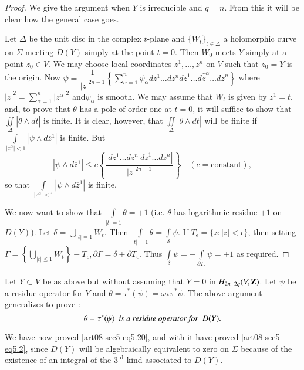 \begin{proof}
We give the argument when $Y$ is irreducible and $q=n$. From this it will be clear how the general case goes.

Let $\Delta$ be the unit disc in the complex $t$-plane and $\{W_{t}\}_{t\in \Delta}$ a holomorphic curve on $\Sigma$ meeting $D(Y)$ simply at the point $t=0$. Then $W_{0}$ meets $Y$ simply at a point $z_{0}\in V$. We may choose local coordinates $z^{1},\ldots,z^{n}$ on $V$ such that $z_{0}=Y$ is the origin. Now $\psi=\dfrac{1}{|z|^{2n-1}}\left\{\sum\limits^{n}_{\alpha=1}\psi_{\alpha}dz^{1}\ldots dz^{n}d\overline{z}^{1}\ldots d\widehat{\overline{z}}^{\alpha}\ldots d\overline{z}^{n}\right\}$ where $|z|^{2}=\sum\limits^{n}_{\alpha=1}|z^{\alpha}|^{2}$ and\pageoriginale $\psi_{\alpha}$ is smooth. We may assume that $W_{t}$ is given by $z^{1}=t$, and, to prove that $\theta$ has a pole of order one at $t=0$, it will suffice to show that $\iint\limits_{\Delta}|\theta\wedge d\overline{t}|$ is finite. It is clear, however, that $\iint\limits_{\Delta}|\theta\wedge d\overline{t}|$ will be finite if $\int\limits_{|z^{\alpha}|<1}|\psi\wedge d\overline{z}^{1}|$ is finite. But
$$
|\psi \wedge d\overline{z}^{1}|\leq c\left\{\dfrac{|dz^{1}\ldots dz^{n} \ d\overline{z}^{1}\ldots d\overline{z}^{n}|}{|z|^{2n-1}}\right\}\quad(c=\text{constant}),
$$
so that $\int\limits_{|z^{\alpha}|<1}|\psi\wedge d\overline{z}^{1}|$ is finite.

We now want to show that $\int\limits_{|t|=1}\theta=+1$ (i.e. $\theta$ has logarithmic residue $+1$ on $D(Y)$). Let $\delta=\bigcup\limits_{|t|=1}W_{t}$. Then $\int\limits_{|t|=1}\theta=\int\limits_{\delta}\psi$. If $T_{\epsilon}=\{z:|z|<\epsilon\}$, then setting $\Gamma=\left\{\bigcup\limits_{|t|\leq 1}W_{t}\right\}-T_{\epsilon},\partial \Gamma=\delta+\partial T_{\epsilon}$. Thus $\int\limits_{\delta}\psi=-\int\limits_{\partial T_{\epsilon}}\psi=+1$ as required.
\end{proof}

\begin{remark*}
Let $Y\subset V$ be as above but without assuming that $Y=0$ in $H_{2n-2q}(V,\mathbf{Z})$. Let $\psi$ be a residue operator for $Y$ and $\theta=\tau^{*}(\psi)=\widetilde{\omega}_{*}\pi^{*}\psi$. The above argument generalizes to prove : 
\begin{equation}
\theta=\tau^{*}(\psi)\text{~ \em is a residue operator for~ } D(Y).\label{art08-sec5-eq5.23}
\end{equation}

We have now proved \eqref{art08-sec5-eq5.20}, and with it have proved \eqref{art08-sec5-eq5.2}, since $D(Y)$ will be algebraically equivalent to zero on $\Sigma$ because of the existence of an integral of the $3^{\text{rd}}$ kind associated to $D(Y)$.
\end{remark*}

